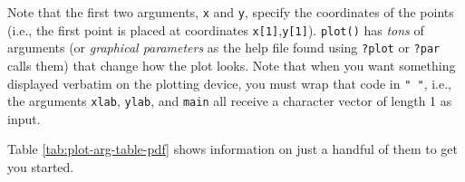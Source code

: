 \documentclass[]{book}
\theoremstyle{definition}
\theoremstyle{definition}
\theoremstyle{definition}
\theoremstyle{remark}
\begin{document}
Note that the first two arguments, \texttt{x} and \texttt{y}, specify
the coordinates of the points (i.e., the first point is placed at
coordinates \texttt{x{[}1{]}},\texttt{y{[}1{]}}). \texttt{plot()} has
\emph{tons} of arguments (or \emph{graphical parameters} as the help
file found using \texttt{?plot} or \texttt{?par} calls them) that change
how the plot looks. Note that when you want something displayed verbatim
on the plotting device, you must wrap that code in \texttt{"\ "}, i.e.,
the arguments \texttt{xlab}, \texttt{ylab}, and \texttt{main} all
receive a character vector of length 1 as input.

Table \ref{tab:plot-arg-table-pdf} shows information on just a handful
of them to get you started.

\begin{table}


\end{table}
\end{document}
